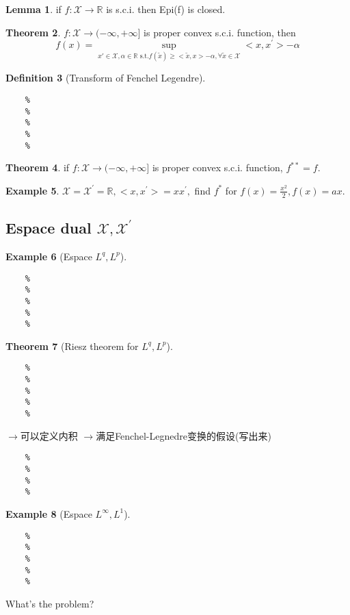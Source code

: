 \documentclass[letterpaper, 11pt]{article}
\let\mc\mathcal
\newcommand{\R}{\mathbb{R}}   %
\newcommand{\1}{\mathds{1}}	%
\theoremstyle{definition}
\newtheorem{theorem}{Theorem}[section]
\newtheorem{lemma}[theorem]{Lemma}
\newtheorem{definition}[theorem]{Definition}
\newtheorem{example}[theorem]{Example}
\begin{document}
\begin{lemma}
    if $f: \mc{X} \rightarrow \R$ is s.c.i. then Epi(f) is closed.
\end{lemma}

\begin{theorem}
    $f: \mc{X} \rightarrow (-\infty,+\infty]$ is proper convex s.c.i. function, then
    $$f(x)=\underset{x' \in \mc{X}, \alpha \in \R \text{ s.t.} f(\tilde{x})\geq <\tilde{x},x>-\alpha, \forall \tilde{x}\in \mc{X}}{\sup} <x,x^{'}>-\alpha$$
\end{theorem}

\begin{definition}[Transform of Fenchel Legendre]
\end{definition}
\begin{lstlisting}
    %
    %
    %
    %
    %
\end{lstlisting}

\begin{theorem}
    if $f: \mc{X} \rightarrow (-\infty,+\infty]$ is proper convex s.c.i. function, $f^{**} = f$.
\end{theorem}
\begin{example}
    $\mc{X}=\mc{X^{'}}=\R, <x,x^{'}>=xx^{'},$ find $f^{*}$ for $f(x)=\frac{x^{2}}{2}, f(x)=ax$.
\end{example}

\newpage
\subsection{Espace dual $\mc{X},\mc{X^{'}}$}
\begin{example}[Espace $L^{q}, L^{p}$]
\end{example}
\begin{lstlisting}
    %
    %
    %
    %
    %
\end{lstlisting}

\begin{theorem}[Riesz theorem for $L^{q}, L^{p}$]
\end{theorem}
\begin{lstlisting}
    %
    %
    %
    %
    %
\end{lstlisting}
$\rightarrow$可以定义内积 $\rightarrow$满足Fenchel-Legnedre变换的假设(写出来)
\begin{lstlisting}
    %
    %
    %
    %
\end{lstlisting}

\begin{example}[Espace $L^{\infty}, L^{1}$]
\end{example}
\begin{lstlisting}
    %
    %
    %
    %
    %
\end{lstlisting}
What's the problem?
\end{document}
